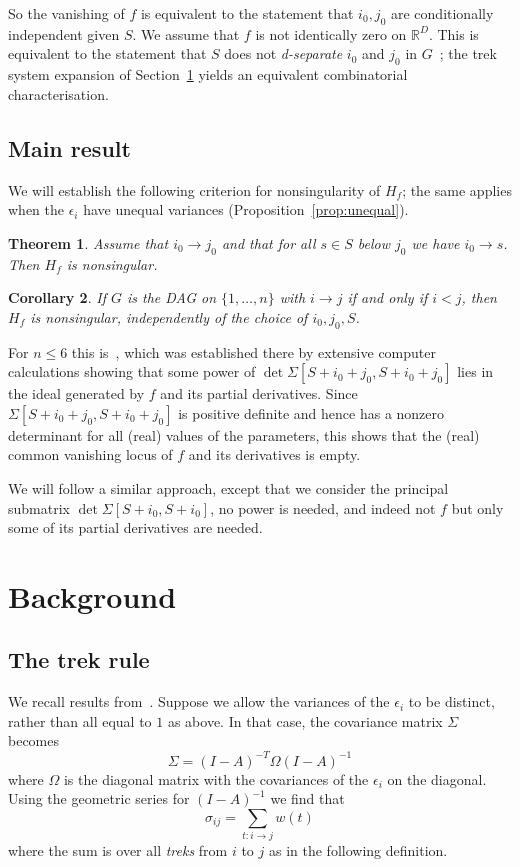 \documentclass[10pt]{amsart}
\newtheorem{theo}{Theorem}[section]
\newtheorem{coro}[theo]{Corollary}
\theoremstyle{definition}
\newcommand{\RR}{\mathbb{R}}
\begin{document}
So the vanishing of $f$ is equivalent to the statement that $i_0,j_0$ are conditionally independent given $S$. We assume that $f$ is not identically zero on $\RR^D$. This is equivalent to the statement that $S$ does not \emph{d-separate} $i_0$ and $j_0$ in $G$~\cite[Section~2.3.4]{Spirtes01}; the trek system expansion of Section~\ref{sec:Background} yields an equivalent combinatorial characterisation.
\subsection*{Main result}

We will establish the following criterion for nonsingularity of $H_f$; the same applies when the $\epsilon_i$ have unequal variances (Proposition~\ref{prop:unequal}).

\begin{theo}
Assume that $i_0 \to j_0$ and that for all $s \in S$ below $j_0$ we have $i_0 \to s$. Then $H_f$ is nonsingular.
\end{theo}
\begin{coro}
If $G$ is the DAG on $\{1,\ldots,n\}$ with $i \to j$ if and only if $i<j$, then $H_f$ is nonsingular, independently of the choice of $i_0,j_0,S$.
\end{coro}

For $n \leq 6$ this is~\cite[Theorem~4.1]{Uhler14}, which was established there by extensive computer calculations showing that some power of $\det \Sigma[S+i_0+j_0,S+i_0+j_0]$ lies in the ideal generated by $f$ and its partial derivatives. Since $\Sigma[S+i_0+j_0,S+i_0+j_0]$ is positive definite and hence has a nonzero determinant for all (real) values of the parameters, this shows that the (real) common vanishing locus of $f$ and its derivatives is empty.

We will follow a similar approach, except that we consider the principal submatrix $\det \Sigma[S+i_0,S+i_0]$, no power is needed, and indeed not $f$ but only some of its partial derivatives are needed.
\section{Background} \label{sec:Background}

\subsection*{The trek rule}

We recall results from~\cite{Draisma09d}. Suppose we allow the variances of the $\epsilon_i$ to be distinct, rather than all equal to $1$ as above. In that case, the covariance matrix $\Sigma$ becomes
\[
\Sigma=(I-A)^{-T} \Omega (I-A)^{-1}
\]
where $\Omega$ is the diagonal matrix with the covariances of the $\epsilon_i$ on the diagonal. Using the geometric series for $(I-A)^{-1}$ we find that
\[
\sigma_{ij}=\sum_{t:i \to j} w(t)
\]
where the sum is over all \emph{treks} from $i$ to $j$ as in the following definition.
\end{document}
